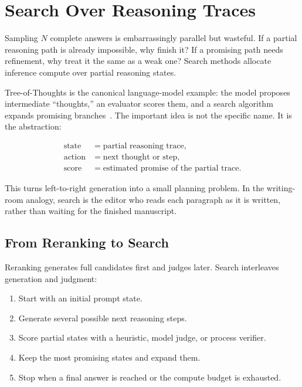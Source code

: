 \section{Search Over Reasoning Traces}
\label{sec:ch18-search}

Sampling $N$ complete answers is embarrassingly parallel but wasteful. If a partial reasoning path is already impossible, why finish it? If a promising path needs refinement, why treat it the same as a weak one? Search methods allocate inference compute over partial reasoning states.

Tree-of-Thoughts is the canonical language-model example: the model proposes intermediate ``thoughts,'' an evaluator scores them, and a search algorithm expands promising branches~\cite{yao2023tree}. The important idea is not the specific name. It is the abstraction:

\begin{align}
  \text{state} &= \text{partial reasoning trace}, \nonumber\\
  \text{action} &= \text{next thought or step}, \nonumber\\
  \text{score} &= \text{estimated promise of the partial trace}.
\end{align}

This turns left-to-right generation into a small planning problem. In the writing-room analogy, search is the editor who reads each paragraph as it is written, rather than waiting for the finished manuscript.

\subsection{From Reranking to Search}

Reranking generates full candidates first and judges later. Search interleaves generation and judgment:

\begin{enumerate}[nosep]
  \item Start with an initial prompt state.
  \item Generate several possible next reasoning steps.
  \item Score partial states with a heuristic, model judge, or process verifier.
  \item Keep the most promising states and expand them.
  \item Stop when a final answer is reached or the compute budget is exhausted.
\end{enumerate}

